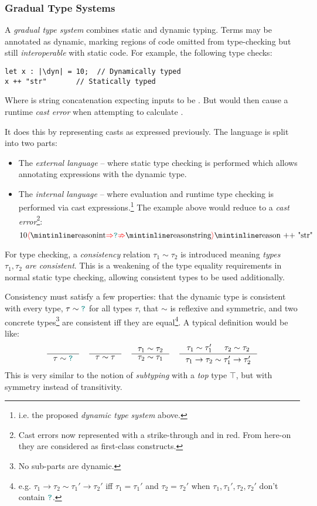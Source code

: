 \subsubsection{Gradual Type Systems}\label{sec:GradualTypeSystem}

A \textit{gradual type system} \cite{GradualRefined, GradualFunctional} combines static and dynamic typing. Terms may be annotated as dynamic, marking regions of code omitted from type-checking but still \textit{interoperable} with static code. For example, the following type checks:
\begin{verbatim}
let x : |\dyn| = 10;  // Dynamically typed
x ++ "str"       // Statically typed
\end{verbatim}
Where \code{++} is string concatenation expecting inputs to be . But would then cause a runtime \textit{cast error} when attempting to calculate .

It does this by representing casts as expressed previously. The language is split into two parts:
\begin{itemize}
\item The \textit{external language} -- where static type checking is performed which allows annotating expressions with the dynamic type.
\item The \textit{internal language} -- where evaluation and runtime type checking is performed via cast expressions.\footnote{i.e. the proposed \textit{dynamic type system} above.} The example above would reduce to a \textit{cast error}\footnote{Cast errors now represented with a strike-through and in red. From here-on they are considered as first-class constructs.}: \[10\scasterror{\code{int}}{\code{string}}\code{ ++ "str"}\]
\end{itemize}
For type checking, a \textit{consistency} relation $\tau_1 \sim \tau_2$ is introduced meaning \textit{types $\tau_1, \tau_2$ are consistent}. This is a weakening of the type equality requirements in normal static type checking, allowing consistent types to be used additionally.

Consistency must satisfy a few properties: that the dynamic type is consistent with every type, $\tau \sim {\color{teal}\texttt{?}}$ for all types $\tau$, that $\sim$ is reflexive and symmetric, and two concrete types\footnote{No sub-parts are dynamic.} are consistent iff they are equal\footnote{e.g. $\tau_1 \to \tau_2 \sim \tau_1' \to \tau_2'$ iff $\tau_1 = \tau_1'$ and $\tau_2 = \tau_2'$ when $\tau_1, \tau_1', \tau_2, \tau_2'$ don't contain ${\color{teal}\texttt{?}}$.}. A typical definition would be like:
\[\inference{}{\tau \sim \dyn} \quad \inference{}{\tau \sim \tau} \quad \inference{\tau_1 \sim \tau_2}{\tau_2 \sim \tau_1} \quad \inference{\tau_1 \sim \tau_1' & \tau_2 \sim \tau_2}{\tau_1 \to \tau_2 \sim \tau_1' \to \tau_2'}\]
This is very similar to the notion of \textit{subtyping} \cite[ch. 15]{TAPL} with a \textit{top} type $\top$, but with symmetry instead of transitivity.

